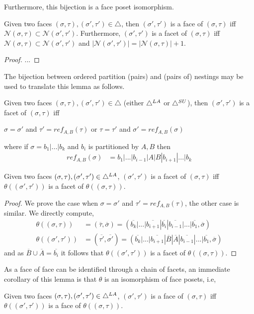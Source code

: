 Furthermore, this bijection is a face poset isomorphism.  
\begin{lemma}
Given two faces $(\sigma,\tau),(\sigma',\tau') \in \triangle$, then $(\sigma',\tau')$ is a face of $(\sigma,\tau) $ iff $\mathcal{N}(\sigma,\tau) \subset \mathcal{N}(\sigma',\tau')$. Furthermore, $(\sigma',\tau')$ is a facet of $(\sigma,\tau) $ iff $\mathcal{N}(\sigma,\tau) \subset \mathcal{N}(\sigma',\tau')$ and $|\mathcal{N}(\sigma',\tau')| = |\mathcal{N}(\sigma,\tau)|+1$.
\end{lemma}
\begin{proof}
...
\end{proof}
The bijection between ordered partition (pairs) and (pairs of) nestings may be used to translate this lemma as follows. 
\begin{corollary}
Given two faces $(\sigma,\tau),(\sigma',\tau') \in \triangle$ (either $\triangle^{LA}$ or $\triangle^{SU}$), then
$(\sigma',\tau')$ is a facet of $(\sigma,\tau)$ iff 
\begin{center}
$\sigma = \sigma'$ and $\tau' = ref_{A,B}(\tau)$ or $\tau = \tau'$ and $\sigma' = ref_{A,B}(\sigma)$
\end{center}
where if $\sigma = b_1|...|b_k$ and $b_i$ is partitioned by $A,B$ then
\begin{align*}
    ref_{A,B}(\sigma) &= b_1|...|b_{i-1}|A|B|b_{i+1}|...|b_k
\end{align*}
\end{corollary}

\begin{lemma}
Given two faces $(\sigma,\tau),(\sigma',\tau') \in \triangle^{LA}$,
$(\sigma',\tau')$ is a facet of $(\sigma,\tau)$ iff $\theta((\sigma',\tau'))$ is a facet of $\theta((\sigma,\tau))$.
\end{lemma}
\begin{proof}
We prove the case when $\sigma = \sigma'$ and $\tau' = ref_{A,B}(\tau)$, the other case is similar. We directly compute,
\begin{align*}
    \theta( (\sigma,\tau)) &= (\overline{\tau},\overline{\sigma}) = (\overline{b_k}|...|\overline{b_{i+1}}|\overline{b_i}|\overline{b_{i-1}}|...|\overline{b_1},\overline{\sigma})\\
    \theta( (\sigma',\tau')) &= (\overline{\tau'},\overline{\sigma'}) = (\overline{b_k}|...|\overline{b_{i+1}}|\overline{B}|\overline{A}|\overline{b_{i-1}}|...|\overline{b_1},\overline{\sigma})
\end{align*}
and as $\overline{B}\cup\overline{A}=\overline{b_i}$ it follows that $\theta((\sigma',\tau'))$ is a facet of $\theta((\sigma,\tau))$.
\end{proof}
As a face of face can be identified through a chain of facets, an immediate corollary of this lemma is that $\theta$ is an isomorphism of face posets, i.e,
\begin{corollary}
Given two faces $(\sigma,\tau),(\sigma',\tau') \in \triangle^{LA}$,
$(\sigma',\tau')$ is a face of $(\sigma,\tau)$ iff $\theta((\sigma',\tau'))$ is a face of $\theta((\sigma,\tau))$. 
\end{corollary}

